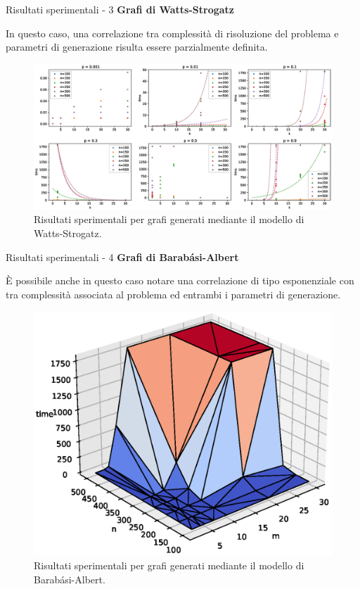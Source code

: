 \documentclass[a4paper]{beamer}
\begin{document}
\begin{frame}{Risultati sperimentali - 3}
\textbf{Grafi di Watts-Strogatz}\\
\parbox{\linewidth}{In questo caso, una correlazione tra complessità di risoluzione del problema e parametri di generazione risulta essere parzialmente definita.}
\begin{figure}[h!]
     \centering
       \includegraphics[scale=0.28]{images/wsgp.eps}
       \vspace{-0.1cm}
       \caption{Risultati sperimentali per grafi generati mediante il modello di Watts-Strogatz.}
        \label{fig:wsgp}
\end{figure}
\end{frame}

\begin{frame}{Risultati sperimentali - 4}
\textbf{Grafi di Barabási-Albert}\\
\parbox{\linewidth}{È possibile anche in questo caso notare una correlazione di tipo esponenziale con tra complessità associata al problema ed entrambi i parametri di generazione.}
\vspace*{-1.5cm}
\begin{figure}
\includegraphics[scale=0.4]{images/bag-3d.eps}
\vspace*{-1.5cm}
\caption{Risultati sperimentali per grafi generati mediante il modello di Barabási-Albert.}
\end{figure}
\end{frame}
\end{document}
